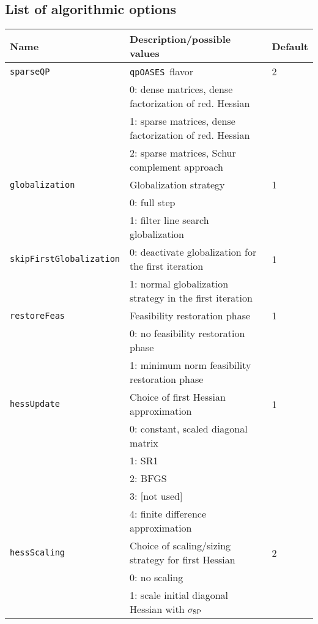 \documentclass[	11pt,
				a4paper,
				abstract=true,
				twoside=true,
				bibliography=totoc, 
				headinclude=true,
				footinclude=false]{scrartcl}
\newcommand{\qpOASES}{\texttt{qpOASES}}
\begin{document}
\subsection{List of algorithmic options}\label{sec:alg-opts}
\begin{longtable}[c]{lll}
Name 							& Description/possible values									& Default	\\\hline\hline
%
\texttt{sparseQP}				& \qpOASES\ flavor												& 2			\\
								& 0: dense matrices, dense factorization of red. Hessian		&			\\
								& 1: sparse matrices, dense factorization of red. Hessian		&			\\
								& 2: sparse matrices, Schur complement approach					&			\\\hline
%
\texttt{globalization}			& Globalization strategy										& 1			\\
								& 0: full step 													&			\\
								& 1: filter line search globalization							&			\\\hline
%
\texttt{skipFirstGlobalization}	& 0: deactivate globalization for the first iteration			& 1			\\
								& 1: normal globalization strategy in the first iteration		&			\\\hline
%
\texttt{restoreFeas}			& Feasibility restoration phase									& 1			\\
								& 0: no feasibility restoration phase 							&			\\
								& 1: minimum norm feasibility restoration phase					&			\\\hline
%
\texttt{hessUpdate}				& Choice of first Hessian approximation							& 1			\\
								& 0: constant, scaled diagonal matrix							&			\\
								& 1: SR1														&			\\
								& 2: BFGS														&			\\
								& 3: [not used]													&			\\
								& 4: finite difference approximation							&			\\\hline
%
\texttt{hessScaling}			& Choice of scaling/sizing strategy for first Hessian			& 2			\\
								& 0: no scaling													&			\\
								& 1: scale initial diagonal Hessian with $\sigma_{\textup{SP}}$	&			\\

\end{longtable}
\end{document}
